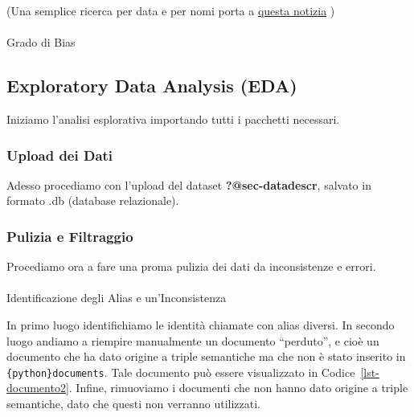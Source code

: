 \documentclass[
  italian,
  a4paper,
]{article}
\makeatletter
\let\oldparagraph\paragraph
\renewcommand{\paragraph}{
    \@ifstar
      \xxxParagraphStar
      \xxxParagraphNoStar
  }
\newcommand{\xxxParagraphStar}[1]{\oldparagraph*{#1}\mbox{}}
\newcommand{\xxxParagraphNoStar}[1]{\oldparagraph{#1}\mbox{}}
\makeatother
\begin{document}
(Una semplice ricerca per data e per nomi porta a
\href{https://www.nytimes.com/2016/12/12/us/politics/rex-tillerson-secretary-of-state-trump.html}{questa
notizia} )

\paragraph{Grado di Bias}\label{grado-di-bias}

\subsection{Exploratory Data Analysis
(EDA)}\label{exploratory-data-analysis-eda}

Iniziamo l'analisi esplorativa importando tutti i pacchetti necessari.

\subsubsection{Upload dei Dati}\label{upload-dei-dati}

Adesso procediamo con l'upload del dataset \textbf{?@sec-datadescr},
salvato in formato .db (database relazionale).

\subsubsection{Pulizia e Filtraggio}\label{pulizia-e-filtraggio}

Procediamo ora a fare una proma pulizia dei dati da inconsistenze e
errori.

\paragraph{Identificazione degli Alias e
un'Inconsistenza}\label{identificazione-degli-alias-e-uninconsistenza}

In primo luogo identifichiamo le identità chiamate con alias diversi. In
secondo luogo andiamo a riempire manualmente un documento ``perduto'', e
cioè un documento che ha dato origine a triple semantiche ma che non è
stato inserito in \texttt{\{python\}documents}. Tale documento può
essere visualizzato in Codice~\ref{lst-documento2}. Infine, rimuoviamo i
documenti che non hanno dato origine a triple semantiche, dato che
questi non verranno utilizzati.
\end{document}
